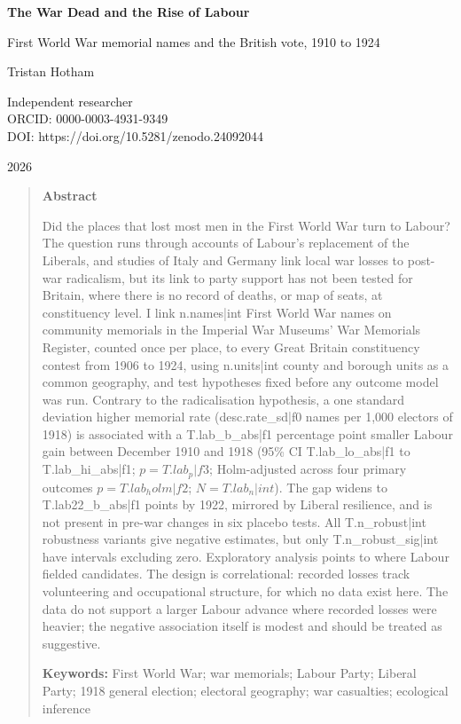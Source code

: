 \documentclass[11pt,a4paper]{article}
\begin{document}
\begin{center}
{\LARGE\bfseries The War Dead and the Rise of Labour\par}
\vspace{0.4em}
{\large First World War memorial names and the British vote, 1910 to 1924\par}
\vspace{1.2em}
{\large Tristan Hotham\par}
\vspace{0.3em}
{\small Independent researcher\\
ORCID: 0000-0003-4931-9349\\
DOI: https://doi.org/10.5281/zenodo.24092044\par}
\vspace{0.8em}
2026
\end{center}

\begin{quote}
\small
\begin{center}\textbf{Abstract}\end{center}
Did the places that lost most men in the First World War turn to Labour? The question runs through accounts of Labour's replacement of the Liberals, and studies of Italy and Germany link local war losses to post-war radicalism, but its link to party support has not been tested for Britain, where there is no record of deaths, or map of seats, at constituency level. I link {{n.names|int}} First World War names on community memorials in the Imperial War Museums' War Memorials Register, counted once per place, to every Great Britain constituency contest from 1906 to 1924, using {{n.units|int}} county and borough units as a common geography, and test hypotheses fixed before any outcome model was run. Contrary to the radicalisation hypothesis, a one standard deviation higher memorial rate ({{desc.rate_sd|f0}} names per 1,000 electors of 1918) is associated with a {{T.lab_b_abs|f1}} percentage point smaller Labour gain between December 1910 and 1918 (95\% CI {{T.lab_lo_abs|f1}} to {{T.lab_hi_abs|f1}}; $p={{T.lab_p|f3}}$; Holm-adjusted across four primary outcomes $p={{T.lab_holm|f2}}$; $N={{T.lab_n|int}}$). The gap widens to {{T.lab22_b_abs|f1}} points by 1922, mirrored by Liberal resilience, and is not present in pre-war changes in six placebo tests. All {{T.n_robust|int}} robustness variants give negative estimates, but only {{T.n_robust_sig|int}} have intervals excluding zero. Exploratory analysis points to where Labour fielded candidates. The design is correlational: recorded losses track volunteering and occupational structure, for which no data exist here. The data do not support a larger Labour advance where recorded losses were heavier; the negative association itself is modest and should be treated as suggestive.

\textbf{Keywords:} First World War; war memorials; Labour Party; Liberal Party; 1918 general election; electoral geography; war casualties; ecological inference
\end{quote}
\end{document}
